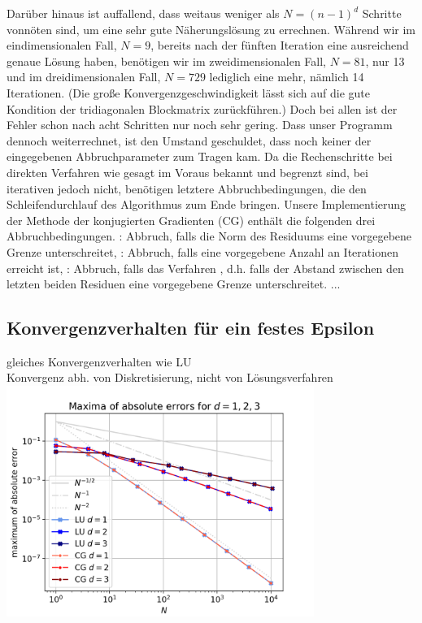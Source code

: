 \documentclass{scrartcl}
\begin{document}
Darüber hinaus ist auffallend, dass weitaus weniger als $N=(n-1)^d$ Schritte vonnöten sind, um eine sehr gute Näherungslösung zu errechnen. 
Während wir im eindimensionalen Fall, $N=9$, bereits nach der fünften Iteration eine ausreichend genaue Lösung haben, benötigen wir im zweidimensionalen Fall, $N=81$, nur 13 und im dreidimensionalen Fall, $N=729$ lediglich eine mehr, nämlich 14 Iterationen.  
(Die große Konvergenzgeschwindigkeit lässt sich auf die gute Kondition der tridiagonalen Blockmatrix zurückführen.) 
Doch bei allen ist der Fehler schon nach acht Schritten nur noch sehr gering. 
Dass unser Programm dennoch weiterrechnet, ist den Umstand geschuldet, dass noch keiner der eingegebenen Abbruchparameter zum Tragen kam. 
Da die Rechenschritte bei direkten Verfahren wie gesagt im Voraus bekannt und begrenzt sind, bei iterativen jedoch nicht, benötigen letztere Abbruchbedingungen, die den Schleifendurchlauf des Algorithmus zum Ende bringen. 
Unsere Implementierung der Methode der konjugierten Gradienten (CG) enthält die folgenden drei Abbruchbedingungen. 
\grqq: Abbruch, falls die Norm des Residuums eine vorgegebene Grenze unterschreitet, \grqq: Abbruch, falls eine vorgegebene Anzahl an Iterationen erreicht ist, \grqq: Abbruch, falls das Verfahren \grqq, d.h. falls der Abstand zwischen den letzten beiden Residuen eine vorgegebene Grenze unterschreitet. ... \\

\pagebreak
\subsection{Konvergenzverhalten für ein festes Epsilon}
gleiches Konvergenzverhalten wie LU \\
Konvergenz abh. von Diskretisierung, nicht von Lösungsverfahren\\

{
  \centering
    \includegraphics[width=0.75\textwidth]{Grafiken/compare}
    \vspace{-0.2cm}
}
\vspace{0.5cm}
\end{document}
